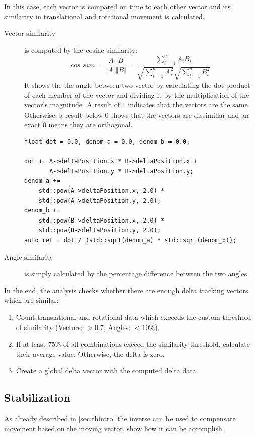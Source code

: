 In this case, each vector is compared on time to each other vector and its similarity in translational and rotational movement is calculated.
\begin{description}
    \item[Vector similarity] is computed by the cosine similarity:
    \[cos\_sim = \frac{A \cdot B}{\Vert A\Vert \Vert B\Vert} = \frac{\sum\limits_{i=1}^{n} A_iB_i}{\sqrt{\sum\limits_{i=1}^{n}A_i^2} \sqrt{\sum\limits_{i=1}^{n}B_i^2}}\]
    It shows the the angle between two vector by calculating the dot product of each member of the vector and dividing it by the multiplication of the vector's magnitude. A result of $1$ indicates that the vectors are the same. Otherwise, a result below $0$ shows that the vectors are dissimiliar and an exact $0$ means they are orthogonal.
\begin{lstlisting}[caption={Cosine similarity},label=lst:cossim]
float dot = 0.0, denom_a = 0.0, denom_b = 0.0;

dot += A->deltaPosition.x * B->deltaPosition.x +
       A->deltaPosition.y * B->deltaPosition.y;
denom_a +=
    std::pow(A->deltaPosition.x, 2.0) *
    std::pow(A->deltaPosition.y, 2.0);
denom_b +=
    std::pow(B->deltaPosition.x, 2.0) *
    std::pow(B->deltaPosition.y, 2.0);
auto ret = dot / (std::sqrt(denom_a) * std::sqrt(denom_b));
\end{lstlisting}
    \item[Angle similarity] is simply calculated by the percentage difference between the two angles.\\
\end{description}

In the end, the analysis checks whether there are enough delta tracking vectors which are similar:
\begin{enumerate}
    \item Count translational and rotational data which exceeds the custom threshold of similarity (Vectors: $>0.7$, Angles: $<10\%$).
    \item If at least $75\%$ of all combinations exceed the similarity threshold, calculate their average value. Otherwise, the delta is zero.
    \item Create a global delta vector with the computed delta data.
\end{enumerate}

\subsection{Stabilization}
As already described in \cref{sec:thintro} the inverse can be used to compensate movement based on the moving vector.  show how it can be accomplish.

